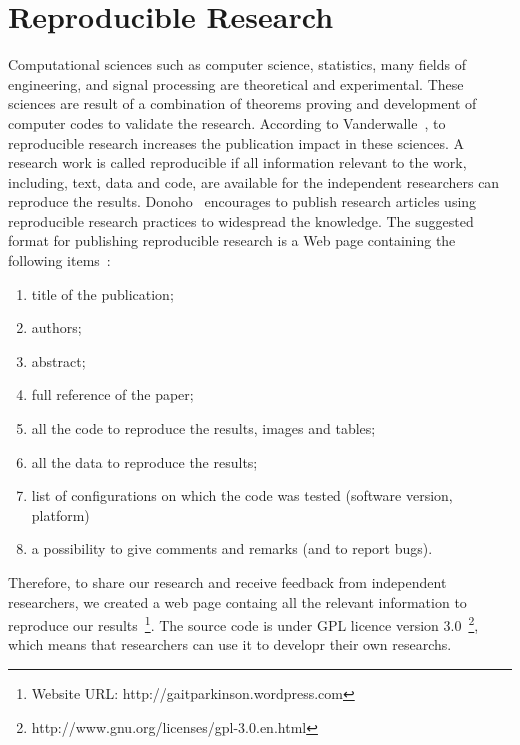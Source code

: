 \documentclass[10pt, conference, compsocconf]{IEEEtran}
\begin{document}
\section{Reproducible Research}\label{sec:reproducible}
Computational sciences such as computer science, statistics, many fields of engineering, and signal processing are  theoretical and experimental. These sciences are result of a combination of theorems proving and development of computer codes to validate the research. According to Vanderwalle~\cite{vandewalle2009}, to reproducible research increases the publication impact in these sciences. A research work is called reproducible if all information relevant to the work, including, text, data and code, are available for the independent researchers can reproduce the results. Donoho~\cite{donoho2010} encourages to publish research articles using reproducible research practices to widespread the knowledge. The suggested format for publishing reproducible research is a Web page containing the following items~\cite{vandewalle2009}:
\begin{enumerate}
	\item title of the publication;
    \item authors;
    \item abstract;
    \item full reference of the paper;
    \item all the code to reproduce the results, images and tables;
    \item all the data to reproduce the results;
    \item list of configurations on which the code was tested (software version, platform)
    \item a possibility to give comments and remarks (and to report bugs).
\end{enumerate}

Therefore, to share our research and receive feedback from independent researchers, we created a web page containg all the relevant information to reproduce our results~\footnote{Website URL: http://gaitparkinson.wordpress.com}. The source code is under GPL licence version 3.0~\footnote{http://www.gnu.org/licenses/gpl-3.0.en.html}, which means that researchers can use it to developr their own researchs.


\end{document}
